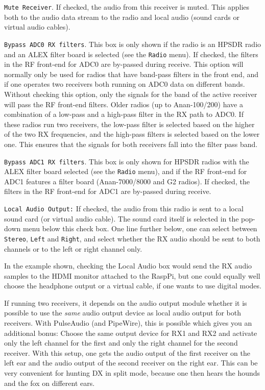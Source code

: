 \documentclass[12pt]{book}
\def\rett#1{\texttt{\color{red}#1}}
\def\bltt#1{\texttt{\color{blue}#1}}
\begin{document}
\rett{Mute Receiver}. If checked, the audio from this receiver is muted.
This applies both to the audio data stream to the radio and local audio
(sound cards or virtual  audio cables).

\rett{Bypass ADC0 RX filters}. This box is only shown if the radio is an HPSDR radio
and an ALEX filter board
is selected (see the \bltt{Radio} menu). If checked, the filters in the RF front-end for ADC0
are by-passed during receive. This option will normally only be used for radios that
have band-pass filters in the front end, and if one operates two receivers both running
on ADC0 data on different bands. Without checking this option, only the signals for
the band of the active receiver will pass the RF front-end filters.
Older radios (up to Anan-100/200)  have a
combination of a low-pass and a high-pass filter in the RX path to ADC0. If these
radios run two receivers, the low-pass filter is selected based on the higher
of the two RX frequencies, and the high-pass filters is selected based on the
lower one. This ensures that the signals for both receivers fall into  the filter
pass band.

\rett{Bypass ADC1 RX filters}. This box is only shown for HPSDR radios with the ALEX filter board
selected (see the \bltt{Radio} menu), and if the RF front-end for ADC1
features a filter board (Anan-7000/8000 and G2 radios).
If checked, the filters in the RF front-end for ADC1
are by-passed during receive.

\rett{Local Audio Output:} If checked, the audio from this radio is sent to a local
sound card (or virtual audio cable). The sound card itself is selected in the
pop-down menu below this check box. One line further below, one can select between
\texttt{Stereo}, \texttt{Left} and \texttt{Right}, and select whether the RX
audio should be sent to both channels or to the left or right channel only.

In the example shown, checking the Local Audio box would send the RX audio
samples to the HDMI monitor attached to the RaspPi, but one could equally
well choose the headphone output or a virtual cable, if one wants to use
digital modes.

If running two receivers, it depends on the audio output module whether
it is possible to use the \textit{same} audio output device as local audio output
for both receivers. With PulseAudio (and PipeWire), this is possible which gives you an additional
bonus:
Choose the same output device for RX1 and RX2 and activate only
the left channel for the first and only the right channel for the second receiver.
With this setup,
one gets the audio output of the first receiver on the left ear and the audio output of
the second receiver on the right ear. This can be very convenient for hunting DX in split mode,
because one then hears the hounds and the fox on different ears.
\end{document}
